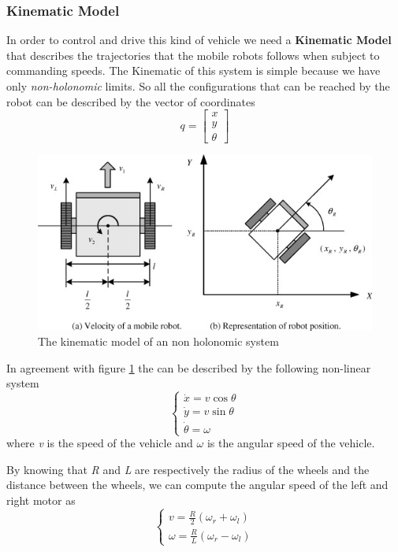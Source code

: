 \subsubsection{Kinematic Model}

In order to control and drive this kind of vehicle we need a \textbf{Kinematic Model} that describes the trajectories that the mobile robots follows when subject to commanding speeds. The Kinematic of this system is simple because we have only \emph{non-holonomic} limits. So all the configurations that can be reached by the robot can be described by the vector of coordinates \[ q= \left[
\begin{matrix}
x\\
y\\
\theta
\end{matrix}
\right] \]

\begin{figure}[H]
  \begin{center}
  \includegraphics[scale=0.8]{FIGURES_3/kinematic_model.png}
    \caption[Unicycle Model]{The kinematic model of an non holonomic system}
    \label{fig:KM model}
  \end{center}
\end{figure}

In agreement with figure \ref{fig:KM model} the \KM{} can be described by the following non-linear system 
\[\begin{cases}
	\dot x =  v \cos{}\theta{}\\
	\dot y =  v \sin{}\theta{}\\
	\dot \theta = \omega 
\end{cases}
\]
where \emph{v} is the speed of the vehicle and $\omega{}$ is the angular speed of the vehicle.

By knowing that \emph{R} and \textit{L} are respectively the radius of the wheels and the distance between the wheels, we can compute the angular speed of the left and right motor as
$$
\begin{cases}
	v =  \frac{R}{2} (\omega_r + \omega_l)\\
	\omega = \frac{R}{L} (\omega_r - \omega_l)
\end{cases}
$$


